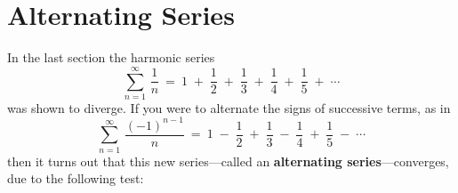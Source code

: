 \section{Alternating Series}
In the last section the harmonic series
\[
\sum_{n=1}^{\infty} \,\frac{1}{n} ~=~ 1 \;+\; \frac{1}{2} \;+\; \frac{1}{3}
\;+\; \frac{1}{4} \;+\; \frac{1}{5} \;+\; \cdots
\]
was shown to diverge. If you were to alternate the signs of successive terms, as
in
\begin{equation}\label{eqn:altharmonic}
\sum_{n=1}^{\infty} \,\frac{(-1)^{n-1}}{n} ~=~ 1 \;-\; \frac{1}{2} \;+\; \frac{1}{3}
\;-\; \frac{1}{4} \;+\; \frac{1}{5} \;-\; \cdots
\end{equation}
then it turns out that this new series---called an
\textbf{alternating series}---converges, due to the
following test:


